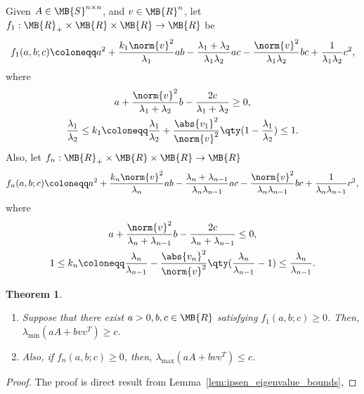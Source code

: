\documentclass[nobib]{my-handout}
\newtheorem{theorem}{Theorem}
\theoremstyle{definition}
\theoremstyle{remark}
\begin{document}
Given $A \in \MB{S}^{n \times n}$, and $v \in \MB{R}^n$, let $f_1 :
\MB{R}_{+} \times \MB{R} \times \MB{R} \to \MB{R}$ be
\begin{equation*}
	f_1(a, b; c) \coloneqq a^2 + \frac{k_1 \norm{v}^2}{\lambda_1} a b -
	\frac{\lambda_1 + \lambda_2}{\lambda_1 \lambda_2} a c -
	\frac{\norm{v}^2}{\lambda_1 \lambda_2} b c +
	\frac{1}{\lambda_1 \lambda_2} c^2,
\end{equation*}
where
\begin{gather*}
	a + \frac{\norm{v}^2}{\lambda_1 + \lambda_2} b - \frac{2 c}{\lambda_1
	+ \lambda_2} \ge 0,\\
	\frac{\lambda_1}{\lambda_2} \le k_1 \coloneqq \frac{\lambda_1}{\lambda_2} +
	\frac{\abs{v_1}^2}{\norm{v}^2} \qty(1 - \frac{\lambda_1}{\lambda_2}) \le 1.
\end{gather*}
Also, let $f_n : \MB{R}_{+} \times \MB{R} \times \MB{R} \to \MB{R}$
\begin{equation*}
	f_n(a, b; c) \coloneqq a^2 + \frac{k_n \norm{v}^2}{\lambda_n} a b -
	\frac{\lambda_n + \lambda_{n-1}}{\lambda_n \lambda_{n-1}} a c -
	\frac{\norm{v}^2}{\lambda_n \lambda_{n-1}} b c + \frac{1}{\lambda_n
	\lambda_{n-1}} c^2,
\end{equation*}
where
\begin{gather*}
	a + \frac{\norm{v}^2}{\lambda_n + \lambda_{n-1}} b - \frac{2 c}{\lambda_n +
	\lambda_{n-1}} \le 0, \\
	1 \le k_n \coloneqq \frac{\lambda_n}{\lambda_{n-1}} -
	\frac{\abs{v_n}^2}{\norm{v}^2} \qty(\frac{\lambda_n}{\lambda_{n-1}} - 1) \le
	\frac{\lambda_n}{\lambda_{n-1}}.
\end{gather*}

\begin{theorem}
	\begin{enumerate}
		\item Suppose that there exist $a>0, b, c \in \MB{R}$ satisfying
			$f_1(a, b; c) \ge 0$. Then, $\lambda_{\min}(a A + b v v^T) \ge c$.
		\item Also, if $f_n(a, b; c) \ge 0$, then, $\lambda_{\max}(a A + b v
			v^T) \le c$.
		\end{enumerate}
\end{theorem}

\begin{proof}
	The proof is direct result from Lemma~\ref{lem:ipsen_eigenvalue_bounds},
\end{proof}
\end{document}
